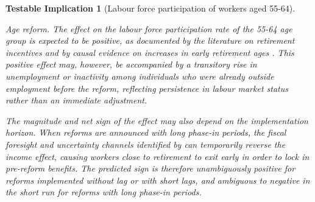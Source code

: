 \documentclass[11pt,english,a4paper, twoside, authoryear]{article}
\newtheorem{testable}{Testable Implication}}
\begin{document}
\begin{testable}[Labour force participation of workers aged 55-64]\label{test:emp_old}

\textit{Age reform.} %
The effect on the labour force participation rate of the 55-64 age group is expected to be positive, as documented by the literature on retirement incentives \citep{GruberWise1999} and by causal evidence on increases in early retirement ages \citep{StaubliZweimuller2013}. This positive effect may, however, be accompanied by a transitory rise in unemployment or inactivity among individuals who were already outside employment before the reform, reflecting persistence in labour market status rather than an immediate adjustment.

The magnitude and net sign of the effect may also depend on the implementation horizon. When reforms are announced with long phase-in periods, the fiscal foresight and uncertainty channels identified by \citet{BiZubairy2023} can temporarily reverse the income effect, causing workers close to retirement to exit early in order to lock in pre-reform benefits. The predicted sign is therefore unambiguously positive for reforms implemented without lag or with short lags, and ambiguous to negative in the short run for reforms with long phase-in periods.


\end{testable}
\end{document}

